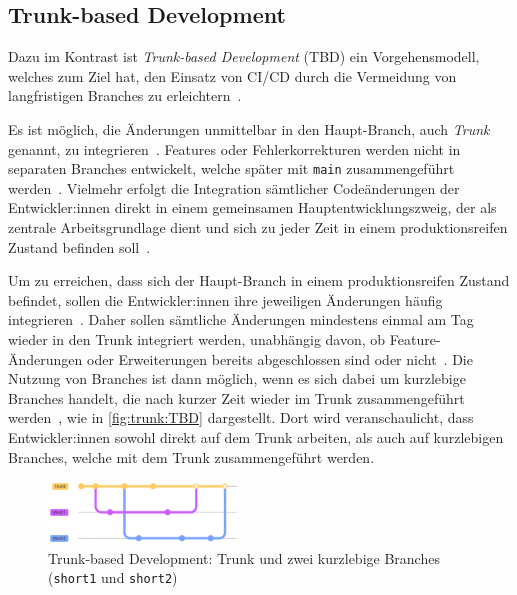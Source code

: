 
\subsection{Trunk-based Development}
\label{sec:workflows:trunk} 

Dazu im Kontrast ist \emph{Trunk-based Development} (TBD) ein Vorgehensmodell, welches zum Ziel hat, den Einsatz von CI/CD durch die Vermeidung von langfristigen Branches zu erleichtern~\cite{trunkbased6}.

Es ist möglich, die Änderungen unmittelbar in den Haupt\hyp Branch, auch \emph{Trunk} genannt, zu integrieren~\cite{trunkbased2}. Features oder Fehlerkorrekturen werden nicht in separaten Branches entwickelt, welche später mit \texttt{main} zusammengeführt werden~\cite{trunkbased2}. Vielmehr erfolgt die Integration sämtlicher Codeänderungen der Entwickler:innen direkt in einem gemeinsamen Hauptentwicklungszweig, der als zentrale Arbeitsgrundlage dient und sich zu jeder Zeit in einem produktionsreifen Zustand befinden soll~\cite{trunkbased1}.

Um zu erreichen, dass sich der Haupt\hyp Branch in einem produktionsreifen Zustand befindet, sollen die Entwickler:innen ihre jeweiligen Änderungen häufig integrieren~\cite{trunkbased2}. Daher sollen sämtliche Änderungen mindestens einmal am Tag wieder in den Trunk integriert werden, unabhängig davon, ob Feature\hyp Änderungen oder Erweiterungen bereits abgeschlossen sind oder nicht~\cite{trunkbased3}. Die Nutzung von Branches ist dann möglich, wenn es sich dabei um kurzlebige Branches handelt, die nach kurzer Zeit wieder im Trunk zusammengeführt werden~\cite{trunkbased7}, wie in \autoref{fig:trunk:TBD} dargestellt. Dort wird veranschaulicht, dass Entwickler:innen sowohl direkt auf dem Trunk arbeiten, als auch auf kurzlebigen Branches, welche mit dem Trunk zusammengeführt werden.

\begin{figure}
    \includegraphics[width=0.45\textwidth]{assets/diagrams/trunk/trunk.pdf}
    \caption{Trunk-based Development: Trunk und zwei kurzlebige Branches (\texttt{short1} und \texttt{short2})}
    \label{fig:trunk:TBD}
\end{figure}


